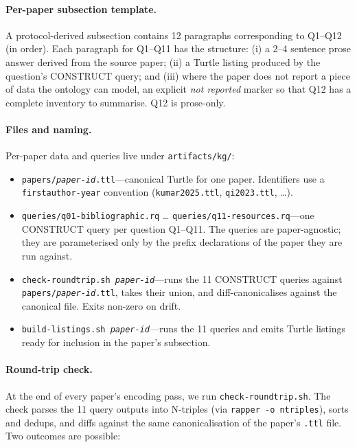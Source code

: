 \paragraph{Per-paper subsection template.}
A protocol-derived subsection contains 12 paragraphs corresponding
to Q1--Q12 (in order). Each paragraph for Q1--Q11 has the structure:
(i) a 2--4 sentence prose answer derived from the source paper;
(ii) a Turtle listing produced by the question's CONSTRUCT query;
and (iii) where the paper does not report a piece of data the
ontology can model, an explicit \emph{not reported} marker so that
Q12 has a complete inventory to summarise. Q12 is prose-only.

\paragraph{Files and naming.}
Per-paper data and queries live under \texttt{artifacts/kg/}:

\begin{itemize}
\item \texttt{papers/\textit{paper-id}.ttl}---canonical Turtle for
  one paper. Identifiers use a \texttt{firstauthor-year} convention
  (\texttt{kumar2025.ttl}, \texttt{qi2023.ttl}, \dots).
\item \texttt{queries/q01-bibliographic.rq} \dots
  \texttt{queries/q11-resources.rq}---one CONSTRUCT query per
  question Q1--Q11. The queries are paper-agnostic; they are
  parameterised only by the prefix declarations of the paper they
  are run against.
\item \texttt{check-roundtrip.sh \textit{paper-id}}---runs the 11
  CONSTRUCT queries against
  \texttt{papers/\textit{paper-id}.ttl}, takes their union, and
  diff-canonicalises against the canonical file. Exits non-zero on
  drift.
\item \texttt{build-listings.sh \textit{paper-id}}---runs the 11
  queries and emits Turtle listings ready for inclusion in the
  paper's subsection.
\end{itemize}

\paragraph{Round-trip check.}
At the end of every paper's encoding pass, we run
\texttt{check-roundtrip.sh}. The check parses the 11 query outputs
into N-triples (via \texttt{rapper -o ntriples}), sorts and dedups,
and diffs against the same canonicalisation of the paper's
\texttt{.ttl} file. Two outcomes are possible:

